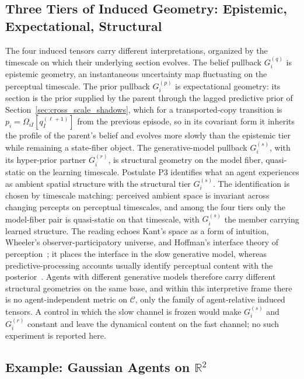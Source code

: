 \subsection{Three Tiers of Induced Geometry: Epistemic, Expectational, Structural}
\label{sec:three_tiers}

The four induced tensors carry different interpretations, organized by the timescale on which their underlying section evolves. The belief pullback $G_i^{(q)}$ is epistemic geometry, an instantaneous uncertainty map fluctuating on the perceptual timescale. The prior pullback $G_i^{(p)}$ is expectational geometry: its section is the prior supplied by the parent through the lagged predictive prior of Section~\ref{sec:cross_scale_shadows}, which for a transported-copy transition is $p_i = \Omega_{iI}[q_I^{(\ell+1)}]$ from the previous episode, so in its covariant form it inherits the profile of the parent's belief and evolves more slowly than the epistemic tier while remaining a state-fiber object. The generative-model pullback $G_i^{(s)}$, with its hyper-prior partner $G_i^{(r)}$, is structural geometry on the model fiber, quasi-static on the learning timescale. Postulate P3 identifies what an agent experiences as ambient spatial structure with the structural tier $G_i^{(s)}$. The identification is chosen by timescale matching: perceived ambient space is invariant across changing percepts on perceptual timescales, and among the four tiers only the model-fiber pair is quasi-static on that timescale, with $G_i^{(s)}$ the member carrying learned structure. The reading echoes Kant's space as a form of intuition, Wheeler's observer-participatory universe, and Hoffman's interface theory of perception~\cite{Hoffman2019}; it places the interface in the slow generative model, whereas predictive-processing accounts usually identify perceptual content with the posterior~\cite{Clark2016, Seth2021}. Agents with different generative models therefore carry different structural geometries on the same base, and within this interpretive frame there is no agent-independent metric on $\mathcal{C}$, only the family of agent-relative induced tensors. A control in which the slow channel is frozen would make $G_i^{(s)}$ and $G_i^{(r)}$ constant and leave the dynamical content on the fast channel; no such experiment is reported here.

\subsection{Example: Gaussian Agents on \texorpdfstring{$\mathbb{R}^2$}{R2}}

